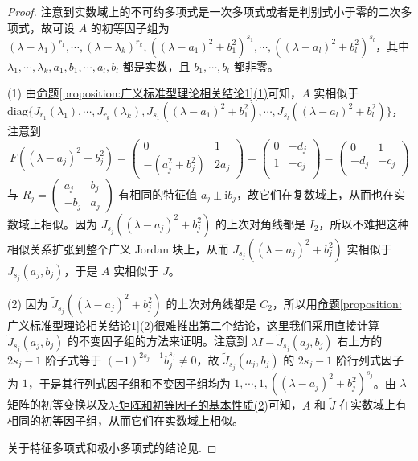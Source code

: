 \documentclass[../../main.tex]{subfiles}
\begin{document}
\begin{proof}
注意到实数域上的不可约多项式是一次多项式或者是判别式小于零的二次多项式，故可设 $A$ 的初等因子组为 $(\lambda - \lambda_1)^{r_1},\cdots,(\lambda - \lambda_k)^{r_k},((\lambda - a_1)^2 + b_1^2)^{s_1},\cdots,((\lambda - a_l)^2 + b_l^2)^{s_l}$，其中 $\lambda_1,\cdots,\lambda_k,a_1,b_1,\cdots,a_l,b_l$ 都是实数，且 $b_1,\cdots,b_l$ 都非零。

(1) 由\hyperref[proposition:广义标准型理论相关结论1]{命题\ref{proposition:广义标准型理论相关结论1}(1)}可知，$A$ 实相似于 $\mathrm{diag}\{J_{r_1}(\lambda_1),\cdots,J_{r_k}(\lambda_k),J_{s_1}((\lambda - a_1)^2 + b_1^2),\cdots,J_{s_l}((\lambda - a_l)^2 + b_l^2)\}$，注意到 
$$
F((\lambda - a_j)^2 + b_j^2) = \begin{pmatrix}0 & 1 \\ -(a_j^2 + b_j^2) & 2a_j\end{pmatrix}=\left( \begin{matrix}
0&		-d_j\\
1&		-c_j\\
\end{matrix} \right) =\left( \begin{matrix}
0&		1\\
-d_j&		-c_j\\
\end{matrix} \right) 
$$
与 $R_j = \begin{pmatrix}a_j & b_j \\ -b_j & a_j\end{pmatrix}$ 有相同的特征值 $a_j\pm \mathrm{i}b_j$，故它们在复数域上，从而也在实数域上相似。因为 $J_{s_j}((\lambda - a_j)^2 + b_j^2)$ 的上次对角线都是 $I_2$，所以不难把这种相似关系扩张到整个广义 Jordan 块上，从而 $J_{s_j}((\lambda - a_j)^2 + b_j^2)$ 实相似于 $J_{s_j}(a_j,b_j)$，于是 $A$ 实相似于 $J$。

(2) 因为 $\widetilde{J}_{s_j}((\lambda - a_j)^2 + b_j^2)$ 的上次对角线都是 $C_2$，所以用\hyperref[proposition:广义标准型理论相关结论1]{命题\ref{proposition:广义标准型理论相关结论1}(2)}很难推出第二个结论，这里我们采用直接计算 $\widetilde{J}_{s_j}(a_j,b_j)$ 的不变因子组的方法来证明。注意到 $\lambda I - \widetilde{J}_{s_j}(a_j,b_j)$ 右上方的 $2s_j - 1$ 阶子式等于 $(-1)^{2s_j - 1}b_j^{s_j}\neq 0$，故 $\widetilde{J}_{s_j}(a_j,b_j)$ 的 $2s_j - 1$ 阶行列式因子为 $1$，于是其行列式因子组和不变因子组均为 $1,\cdots,1,((\lambda - a_j)^2 + b_j^2)^{s_j}$。由 $\lambda$-矩阵的初等变换以及\hyperref[theorem:lambda-矩阵和初等因子的基本性质]{$\lambda$-矩阵和初等因子的基本性质(2)}可知，$A$ 和 $\widetilde{J}$ 在实数域上有相同的初等因子组，从而它们在实数域上相似。

关于特征多项式和极小多项式的结论见.

\end{proof}
\end{document}
